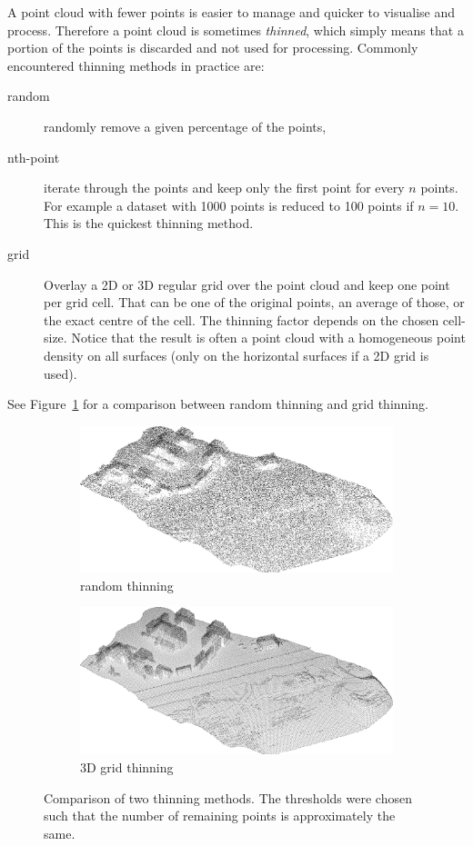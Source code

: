 A point cloud with fewer points is easier to manage and quicker to visualise and process.
Therefore a point cloud is sometimes \emph{thinned}, which simply means that a portion of the points is discarded and not used for processing.
Commonly encountered thinning methods in practice are:
\begin{description}
  \item[random] randomly remove a given percentage of the points,
  \item[nth-point] iterate through the points and keep only the first point for every $n$ points. For example a dataset with 1000 points is reduced to 100 points if $n=10$. This is the quickest thinning method.
  \item[grid] Overlay a 2D or 3D regular grid over the point cloud and keep one point per grid cell. That can be one of the original points, an average of those, or the exact centre of the cell. The thinning factor depends on the chosen cell-size. Notice that the result is often a point cloud with a homogeneous point density on all surfaces (only on the horizontal surfaces if a 2D grid is used).
\end{description}
See Figure~\ref{fig:randvsgrid} for a comparison between random thinning and grid thinning.
\begin{figure}
  \centering
  \begin{subfigure}[b]{0.95\linewidth}
    \centering
    \includegraphics[width=\textwidth]{figs/rand01.png}
    \caption{random thinning}
  \end{subfigure}

  \begin{subfigure}[b]{0.95\linewidth}
    \centering
    \includegraphics[width=\textwidth]{figs/voxel08m.png}
    \caption{3D grid thinning}
  \end{subfigure}
\caption{Comparison of two thinning methods. The thresholds were chosen such that the number of remaining points is approximately the same.}
\label{fig:randvsgrid}
\end{figure}

